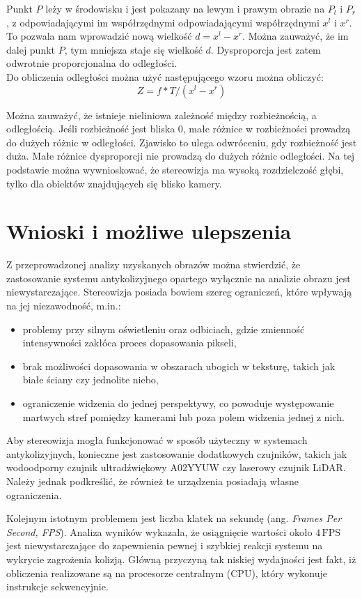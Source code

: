 \documentclass[magisterska]{pracadypl}
\begin{document}
Punkt $P$ leży w środowisku i jest pokazany na
lewym i prawym obrazie na $P_l$ i $P_r$, z odpowiadającymi im współrzędnymi
odpowiadającymi współrzędnymi $x^l$ i $x^r$. To pozwala nam wprowadzić nową wielkość $d = x^l - x^r$.
Można zauważyć, że im dalej punkt $P$, tym mniejsza staje się wielkość $d$. Dysproporcja jest zatem odwrotnie proporcjonalna do odległości.\\
Do obliczenia odległości można użyć następującego wzoru można obliczyć: \[Z=f*T/(x^l-x^r)\]

Można zauważyć, że istnieje nieliniowa zależność między rozbieżnością, a odległością.
Jeśli rozbieżność jest bliska 0, małe różnice w rozbieżności prowadzą do dużych różnic w odległości.
Zjawisko to ulega odwróceniu, gdy rozbieżność jest duża. Małe różnice dysproporcji nie prowadzą do dużych różnic odległości. Na tej podstawie można wywnioskować, że stereowizja ma wysoką rozdzielczość głębi, tylko dla obiektów znajdujących się blisko kamery.

\chapter{Wnioski i możliwe ulepszenia}

Z przeprowadzonej analizy uzyskanych obrazów można stwierdzić, że zastosowanie systemu antykolizyjnego opartego wyłącznie na analizie obrazu jest niewystarczające. 
Stereowizja posiada bowiem szereg ograniczeń, które wpływają na jej niezawodność, m.in.: 

\begin{itemize}
    \item problemy przy silnym oświetleniu oraz odbiciach, gdzie zmienność intensywności zakłóca proces dopasowania pikseli,
    \item brak możliwości dopasowania w obszarach ubogich w teksturę, takich jak białe ściany czy jednolite niebo,
    \item ograniczenie widzenia do jednej perspektywy, co powoduje występowanie martwych stref pomiędzy kamerami lub poza polem widzenia jednej z nich.
\end{itemize}

Aby stereowizja mogła funkcjonować w sposób użyteczny w systemach antykolizyjnych, konieczne jest zastosowanie dodatkowych czujników, takich jak wodoodporny czujnik ultradźwiękowy A02YYUW czy laserowy czujnik LiDAR. Należy jednak podkreślić, że również te urządzenia posiadają własne ograniczenia.

Kolejnym istotnym problemem jest liczba klatek na sekundę (ang. \textit{Frames Per Second, FPS}). Analiza wyników wykazała, że osiągnięcie wartości około $4\,\text{FPS}$ jest niewystarczające do zapewnienia pewnej i szybkiej reakcji systemu na wykrycie zagrożenia kolizją. Główną przyczyną tak niskiej wydajności jest fakt, iż obliczenia realizowane są na procesorze centralnym (CPU), który wykonuje instrukcje sekwencyjnie.
\end{document}
